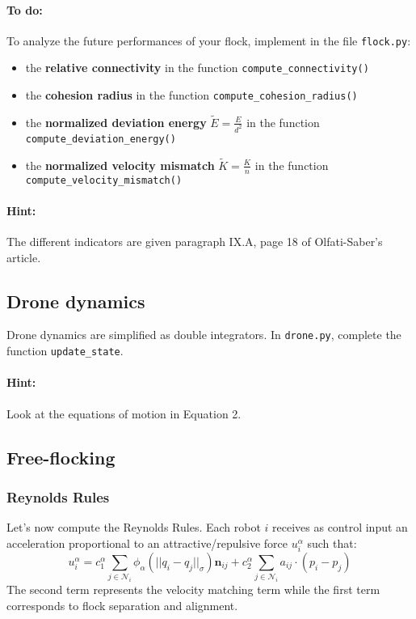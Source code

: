 \documentclass{article}
\begin{document}
\paragraph{To do:}
To analyze the future performances of your flock, implement in the file \texttt{flock.py}:
\begin{itemize}
 \item the \textbf{relative connectivity} in the function \texttt{compute\_connectivity()}
 \item the \textbf{cohesion radius} in the function \texttt{compute\_cohesion\_radius()}
 \item the \textbf{normalized deviation energy} $\widetilde{E} = \frac{E}{d^2}$ in the function \texttt{compute\_deviation\_energy()}
 \item the \textbf{normalized velocity mismatch} $\widetilde{K} = \frac{K}{n}$ in the function \texttt{compute\_velocity\_mismatch()}
\end{itemize}


\paragraph{Hint:} The different indicators are given paragraph IX.A, page 18 of Olfati-Saber's article.

\subsection{Drone dynamics}
Drone dynamics are simplified as double integrators. In \texttt{drone.py}, complete the function \texttt{update\_state}.
\paragraph{Hint:} Look at the equations of motion in Equation 2.

\subsection{Free-flocking}
\subsubsection{Reynolds Rules}
Let's now compute the Reynolds Rules. Each robot $i$ receives as control input an acceleration proportional to an attractive/repulsive force $u_i^\alpha$ such that:
$$
u_i^\alpha = c_1^{\alpha} \sum_{j\in \mathcal{N}_i}\phi_\alpha(||q_i - q_j||_\sigma)\mathbf{n}_{ij} + c_2^{\alpha} \sum_{j\in \mathcal{N}_i}a_{ij}\cdot(p_i-p_j)
$$
The second term represents the velocity matching term while the first term corresponds to flock separation and alignment.
\end{document}
